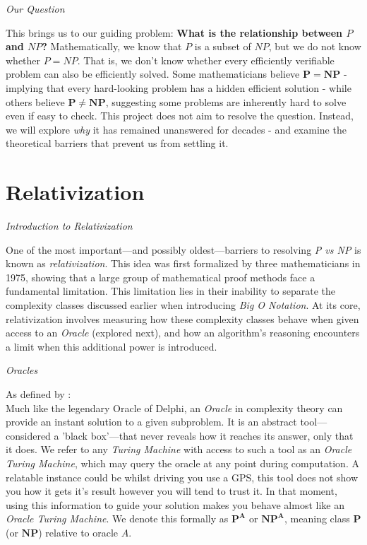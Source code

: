 \documentclass[12pt]{report}
\begin{document}
\begin{center}
    \vspace{0cm}
    {\Large\itshape Our Question\par}
\end{center}
This brings us to our guiding problem: \textbf{What is the relationship between $P$ and $NP$?}
Mathematically, we know that $P$ is a subset of $NP$, but we do not know whether $P = NP$. That is, we don't know whether every efficiently verifiable problem can also be efficiently solved.
Some mathematicians believe $\mathbf{P = NP}$ - implying that every hard-looking problem has a hidden efficient solution - while others believe $\mathbf{P \neq NP}$, suggesting some problems are inherently hard to solve even if easy to check.
This project does not aim to resolve the question. Instead, we will explore \textit{why} it has remained unanswered for decades - and examine the theoretical barriers that prevent us from settling it.
\vspace{4cm}

\section*{Relativization}
\begin{center}
    \vspace{0cm}
    {\Large\itshape Introduction to Relativization\par}
\end{center}
One of the most important—and possibly oldest—barriers to resolving \textit{P vs NP} is known as \textit{relativization}.
This idea was first formalized by three mathematicians in 1975, showing that a large group of mathematical proof methods face a fundamental limitation.
This limitation lies in their inability to separate the complexity classes discussed earlier when introducing \textit{Big O Notation}.
At its core, relativization involves measuring how these complexity classes behave when given access to an \textit{Oracle} (explored next), and how an algorithm's reasoning encounters a limit when this additional power is introduced.

\begin{center}
    \vspace{0cm}
    {\Large\itshape Oracles\par}
\end{center}
As defined by \cite{arora2009}:\\
Much like the legendary Oracle of Delphi, an \textit{Oracle} in complexity theory can provide an instant solution to a given subproblem.
It is an abstract tool—considered a 'black box'—that never reveals how it reaches its answer, only that it does.
We refer to any \textit{Turing Machine} with access to such a tool as an \textit{Oracle Turing Machine}, which may query the oracle at any point during computation.
A relatable instance could be whilst driving you use a GPS, this tool does not show you how it gets it's result however you will tend to trust it.
In that moment, using this information to guide your solution makes you behave almost like an \textit{Oracle Turing Machine}.
We denote this formally as $\mathbf{P^A}$ or $\mathbf{NP^A}$, meaning class $\mathbf{P}$ (or $\mathbf{NP}$) relative to oracle $A$.
\end{document}
